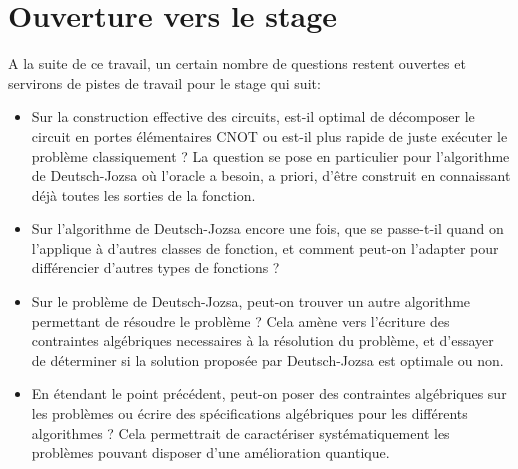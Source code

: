 \chapter{Ouverture vers le stage}

A la suite de ce travail, un certain nombre de questions restent ouvertes et servirons de pistes de travail pour le stage qui suit:

\begin{itemize}
    \item Sur la construction effective des circuits, est-il optimal de décomposer le circuit en portes élémentaires CNOT ou est-il plus rapide de juste exécuter le problème classiquement ? La question se pose en particulier pour l'algorithme de Deutsch-Jozsa où l'oracle a besoin, a priori, d'être construit en connaissant déjà toutes les sorties de la fonction.
    \item Sur l'algorithme de Deutsch-Jozsa encore une fois, que se passe-t-il quand on l'applique à d'autres classes de fonction, et comment peut-on l'adapter pour différencier d'autres types de fonctions ?
    \item Sur le problème de Deutsch-Jozsa, peut-on trouver un autre algorithme permettant de résoudre le problème ? Cela amène vers l'écriture des contraintes algébriques necessaires à la résolution du problème, et d'essayer de déterminer si la solution proposée par Deutsch-Jozsa est optimale ou non.
    \item En étendant le point précédent, peut-on poser des contraintes algébriques sur les problèmes ou écrire des spécifications algébriques pour les différents algorithmes ? Cela permettrait de caractériser systématiquement les problèmes pouvant disposer d'une amélioration quantique.
\end{itemize}